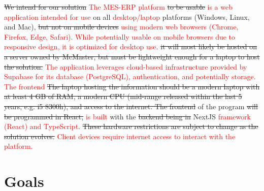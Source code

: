 \documentclass{article}
\begin{document}
\hspace{0.5cm} \sout{We intend for our solution} \textcolor{red}{The MES-ERP platform} \sout{to be usable} \textcolor{red}{is a web application intended for use} on all \textcolor{red}{desktop/laptop} platforms (Windows, Linux, and Mac), \sout{but not on mobile devices} \textcolor{red}{using modern web browsers (Chrome, Firefox, Edge, Safari). While potentially usable on mobile browsers due to responsive design, it is optimized for desktop use}. \sout{it will most likely be hosted on a server owned by McMaster, but must be lightweight enough for a laptop to host the solution.} \textcolor{red}{The application leverages cloud-based infrastructure provided by Supabase for its database (PostgreSQL), authentication, and potentially storage. The frontend} \sout{The laptop hosting the information should be a modern laptop with at least 4 GB of RAM, a modern CPU (mid-range released within the last 5 years, e.g. i5 8300h), and access to the internet. The frontend} of the program \sout{will be programmed in React,} \textcolor{red}{is built} with the \sout{backend being in} NextJS \textcolor{red}{framework (React) and TypeScript}. \sout{These hardware restrictions are subject to change as the solution evolves.} \textcolor{red}{Client devices require internet access to interact with the platform.}

\section{Goals} %
\end{document}
